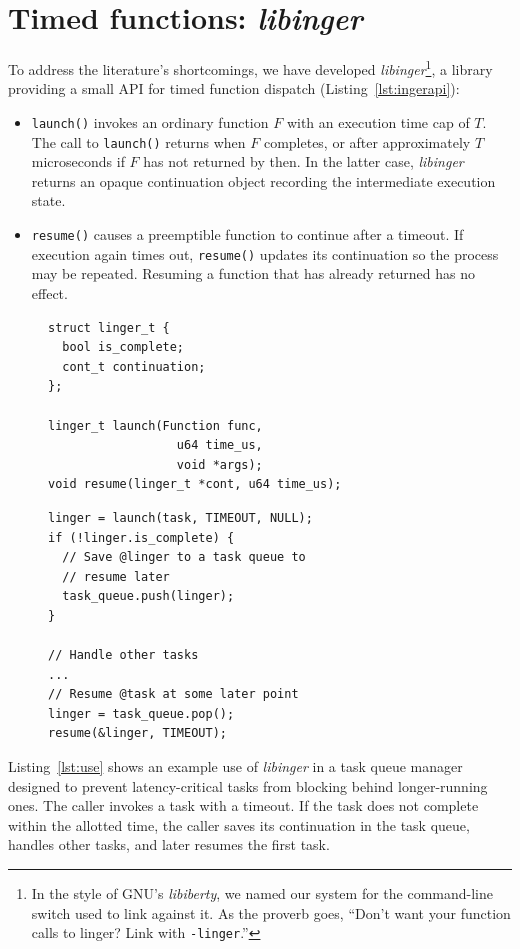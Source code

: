 \section{Timed functions: \textit{libinger}}
\label{sec:libinger}

To address the literature's shortcomings, we have developed
\textit{libinger}\footnote{In the style of GNU's \textit{libiberty}, we named our
system for the command-line switch used to link against it.  As the proverb goes,
``Don't want your function calls to linger?  Link with \texttt{-linger}.''},
a library providing a small API for timed function dispatch
(Listing~\ref{lst:ingerapi}):
\begin{itemize}
\item \texttt{launch()} invokes an ordinary function $F$ with an
execution time cap of $T$.  The call to \texttt{launch()} returns when $F$
completes, or after approximately $T$ microseconds if $F$ has not returned
by then.  In the latter case, \textit{libinger} returns an opaque continuation
object recording the intermediate execution state.
\item \texttt{resume()} causes a preemptible function to continue after a timeout.
If execution again times out, \texttt{resume()} updates its continuation so the
process may be repeated.  Resuming a function that has already returned has no
effect.
\end{itemize}

\begin{figure}[t]
\begin{lstlisting}[label=lst:ingerapi,caption=Preemptible functions core interface]
struct linger_t {
  bool is_complete;
  cont_t continuation;
};

linger_t launch(Function func,
                  u64 time_us,
                  void *args);
void resume(linger_t *cont, u64 time_us);
\end{lstlisting}
\begin{lstlisting}[label=lst:use, caption=Preemptible function usage example]
linger = launch(task, TIMEOUT, NULL);
if (!linger.is_complete) {
  // Save @linger to a task queue to
  // resume later
  task_queue.push(linger);
}

// Handle other tasks
...
// Resume @task at some later point
linger = task_queue.pop();
resume(&linger, TIMEOUT);
\end{lstlisting}
\end{figure}

Listing~\ref{lst:use} shows an example use of \textit{libinger}
in a task queue manager designed to prevent latency-critical tasks from blocking
behind longer-running
ones. The caller invokes a task with a timeout. If the task does not complete
within the allotted time, the caller saves its continuation in the task queue,
handles other tasks, and later resumes the first task.


